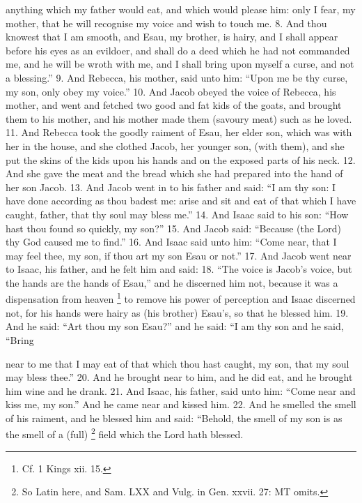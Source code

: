 anything which my father would eat, and which would please him: only I fear, my mother, that he will recognise my voice and wish to touch me. 8. And thou knowest that I am smooth, and Esau, my brother, is hairy, and I shall appear before his eyes as an evildoer, and shall do a deed which he had not commanded me, and he will be wroth with me, and I shall bring upon myself a curse, and not a blessing.'' 9. And Rebecca, his mother, said unto him: ``Upon me be thy curse, my son, only obey my voice.'' 10. And Jacob obeyed the voice of Rebecca, his mother, and went and fetched two good and fat kids of the goats, and brought them to his mother, and his mother made them (savoury meat) such as he loved. 11. And Rebecca took the goodly raiment of Esau, her elder son, which was with her in the house, and she clothed Jacob, her younger son, (with them), and she put the skins of the kids upon his hands and on the exposed parts of his neck. 12. And she gave the meat and the bread which she had prepared into the hand of her son Jacob. 13. And Jacob went in to his father and said: ``I am thy son: I have done according as thou badest me: arise and sit and eat of that which I have caught, father, that thy soul may bless me.'' 14. And Isaac said to his son: ``How hast thou found so quickly, my son?'' 15. And Jacob said: ``Because (the Lord) thy God caused me to find.'' 16. And Isaac said unto him: ``Come near, that I may feel thee, my son, if thou art my son Esau or not.'' 17. And Jacob went near to Isaac, his father, and he felt him and said: 18. ``The voice is Jacob's voice, but the hands are the hands of Esau,'' and he discerned him not, because it was a dispensation from heaven \footnote{Cf. 1 Kings xii. 15.} to remove his power of perception and Isaac discerned not, for his hands were hairy as (his brother) Esau's, so that he blessed him. 19. And he said: ``Art thou my son Esau?'' and he said: ``I am thy son and he said, ``Bring

near to me that I may eat of that which thou hast caught, my son, that my soul may bless thee.'' 20. And he brought near to him, and he did eat, and he brought him wine and he drank. 21. And Isaac, his father, said unto him: ``Come near and kiss me, my son.'' And he came near and kissed him. 22. And he smelled the smell of his raiment, and he blessed him and said: ``Behold, the smell of my son is as the smell of a (full) \footnote{So Latin here, and Sam. LXX and Vulg. in Gen. xxvii. 27: MT omits.} field which the Lord hath blessed.

